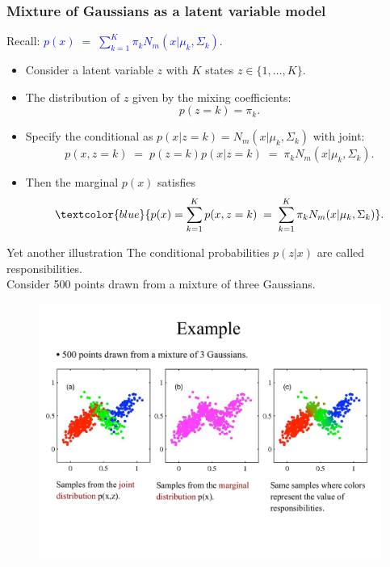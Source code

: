 \documentclass[11pt,handout,aspectratio=169]{beamer}
\begin{document}
\begin{frame}
\frametitle{Mixture of Gaussians as a latent variable model}
Recall: \textcolor{blue}{$p(x)\;=\;\sum_{k=1}^K \pi_k N_m(x|\mu_k,\Sigma_k)$}.\\[.3cm]
\begin{itemize}
	\item Consider a latent variable $z$ with $K$ states $z\in \{1,\ldots,K\}$. 
	\item The distribution of $z$ given by the mixing coefficients: $$p(z=k)=\pi_k.$$
	\item Specify the conditional as $p(x|z=k)=N_m(x|\mu_k,\Sigma_k)$ with joint: $$p(x,z=k)\;=\;p(z=k)p(x|z=k)\;=\;\pi_k N_m(x|\mu_k,\Sigma_k).$$
	\item Then the marginal $p(x)$ satisfies $$\textcolor{blue}{p(x)=\sum_{k=1}^K p(x,z=k)\;=\;\sum_{k=1}^K \pi_k N_m(x|\mu_k,\Sigma_k)}.$$
\end{itemize}
\end{frame}

\begin{frame}{Yet another illustration}
The conditional probabilities $p(z|x)$ are called responsibilities.\\[3mm]
Consider 500 points drawn from a mixture of three Gaussians. 
\begin{figure}
\includegraphics[width=4.8in]{pics/raw2.pdf}
\end{figure}
\end{frame}
\end{document}
